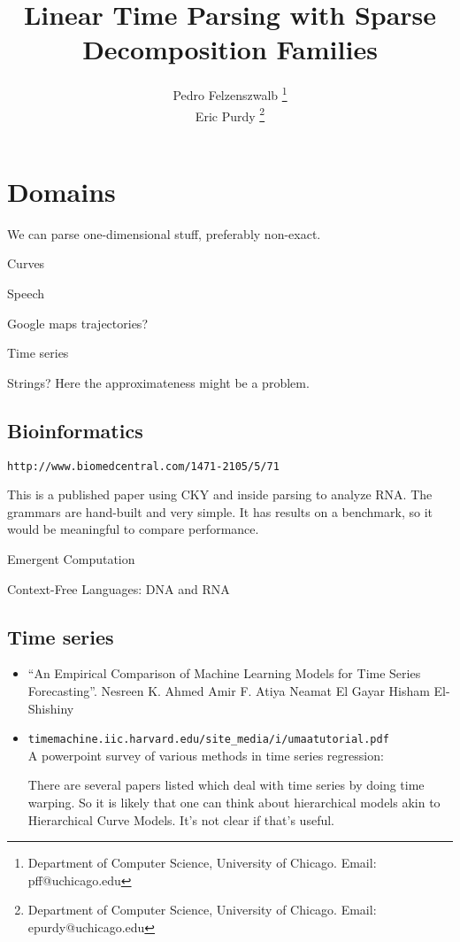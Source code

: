 \documentclass{article}
\title{Linear Time Parsing with Sparse Decomposition Families}
\author{Pedro Felzenszwalb \footnote{Department of Computer Science, University of Chicago. Email: pff@uchicago.edu}\\
Eric Purdy \footnote{Department of Computer Science, University of Chicago. Email: epurdy@uchicago.edu}}
\begin{document}
\maketitle


\section{Domains}
We can parse one-dimensional stuff, preferably non-exact.

\bitem
\item Curves
\item Speech
\item Google maps trajectories?
\item Time series
\item Strings? Here the approximateness might be a problem.
\eitem

\subsection{Bioinformatics}

\bitem
\item {\tt http://www.biomedcentral.com/1471-2105/5/71}

This is a published paper using CKY and inside parsing to analyze RNA.
The grammars are hand-built and very simple.
It has results on a benchmark, so it would be meaningful to compare performance.

\item 
Emergent Computation

Context-Free Languages: DNA and RNA 
\eitem

\subsection{Time series}
\begin{itemize}
\item ``An Empirical Comparison of Machine Learning Models for Time
  Series Forecasting''. Nesreen K. Ahmed Amir F. Atiya Neamat El Gayar
  Hisham El-Shishiny

\item {\tt timemachine.iic.harvard.edu/site\_media/i/umaatutorial.pdf}\\
  A powerpoint survey of various methods in time series regression:

  There are several papers listed which deal with time series by doing
  time warping. So it is likely that one can think about hierarchical
  models akin to Hierarchical Curve Models. It's not clear if that's
  useful.
\end{itemize}
\end{document}
